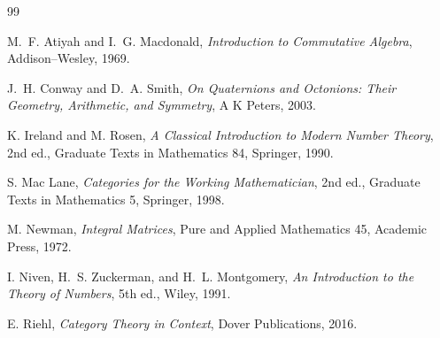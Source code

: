 \documentclass[11pt,a4paper,reqno]{amsart}
\theoremstyle{definition}
\theoremstyle{remark}
\begin{document}
\begin{thebibliography}{99}

M.~F. Atiyah and I.~G. Macdonald,
\emph{Introduction to Commutative Algebra},
Addison--Wesley, 1969.

J.~H. Conway and D.~A. Smith,
\emph{On Quaternions and Octonions: Their Geometry, Arithmetic, and Symmetry},
A K Peters, 2003.

K. Ireland and M. Rosen,
\emph{A Classical Introduction to Modern Number Theory}, 2nd ed.,
Graduate Texts in Mathematics 84, Springer, 1990.

S. Mac Lane,
\emph{Categories for the Working Mathematician}, 2nd ed.,
Graduate Texts in Mathematics 5, Springer, 1998.

M. Newman,
\emph{Integral Matrices},
Pure and Applied Mathematics 45, Academic Press, 1972.

I. Niven, H.~S. Zuckerman, and H.~L. Montgomery,
\emph{An Introduction to the Theory of Numbers}, 5th ed.,
Wiley, 1991.

E. Riehl,
\emph{Category Theory in Context},
Dover Publications, 2016.

\end{thebibliography}
\end{document}
